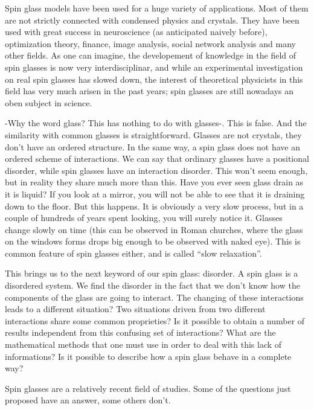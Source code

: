 Spin glass models have been used for a huge variety of applications. Most of them are not strictly connected with condensed physics and crystals. They have been used with great success in neuroscience (as anticipated naively before), optimization theory, finance, image analysis, social network analysis and many other fields. As one can imagine, the developement of knowledge in the field of spin glasses is now very interdisciplinar, and while an experimental investigation on real spin glasses has slowed down, the interest of theoretical physicists in this field has very much arisen in the past years; spin glasses are still nowadays an oben subject in science.

-Why the word glass? This has nothing to do with glasses-. This is false. And the similarity with common glasses is straightforward. Glasses are not crystals, they don't have an ordered structure. In the same way, a spin glass does not have an ordered scheme of interactions. We can say that ordinary glasses have a positional disorder, while spin glasses have an interaction disorder. This won't seem enough, but in reality they share much more than this. Have you ever seen glass drain as it is liquid? If you look at a mirror, you will not be able to see that it is draining down to the floor. But this happens. It is obviously a very slow process, but in a couple of hundreds of years spent looking, you will surely notice it. Glasses change slowly on time (this can be observed in Roman churches, where the glass on the windows forms drops big enough to be observed with naked eye).
This is common feature of spin glasses either, and is called \textquotedblleft slow relaxation\textquotedblright.

This brings us to the next keyword of our spin glass: disorder. A spin glass is a disordered system. We find the disorder in the fact that we don't know how the components of the glass are going to interact. The changing of these interactions leads to a different situation? Two situations driven from two different interactions share some common proprieties? Is it possible to obtain a number of results independent from this confusing set of interactions?
What are the mathematical methods that one must use in order to deal with this lack of informations? Is it possible to describe how a spin glass behave in a complete way?

Spin glasses are a relatively recent field of studies. Some of the questions just proposed have an answer, some others don't.

\vspace{10 mm}

